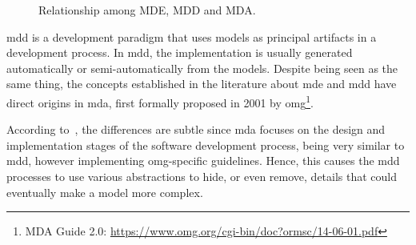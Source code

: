 \begin{figure}[!htb]
    \centering
    \caption{Relationship among MDE, MDD and MDA.}
    
    \label{fig:MDE}
\end{figure}

\ac{mdd} is a development paradigm that uses models as principal artifacts in a development process.
In \ac{mdd}, the implementation is usually generated automatically or semi-automatically from the models.
Despite being seen as the same thing, the concepts established in the literature about \ac{mde} and \ac{mdd} have direct origins in \ac{mda}, first formally proposed in 2001 by \ac{omg}\footnote{MDA Guide 2.0: \url{ https://www.omg.org/cgi-bin/doc?ormsc/14-06-01.pdf}}.

According to~\cite{Sommerville:2015}, the differences are subtle since \ac{mda} focuses on the design and implementation stages of the software development process, being very similar to \ac{mdd}, however implementing \ac{omg}-specific guidelines.
Hence, this causes the \ac{mdd} processes to use various abstractions to hide, or even remove, details that could eventually make a model more complex.



